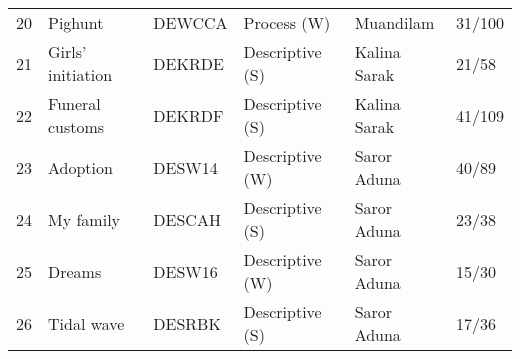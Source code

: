 \begin{tabular}{llllll}
20 & Pighunt  & DEWCCA & Process (W) & Muandilam  & 31/100 \\
21 & Girls' initiation  & DEKRDE & Descriptive (S) & Kalina Sarak  & 21/58 \\
22 & Funeral customs  & DEKRDF & Descriptive (S) & Kalina Sarak  & 41/109 \\
23 & Adoption  & DESW14 & Descriptive (W) & Saror Aduna  & 40/89 \\
24 & My family  & DESCAH & Descriptive (S) & Saror Aduna  & 23/38 \\
25 & Dreams  & DESW16 & Descriptive (W) & Saror Aduna  & 15/30 \\
26 & Tidal wave  & DESRBK & Descriptive (S) & Saror Aduna  & 17/36 \\
\end{tabular}
